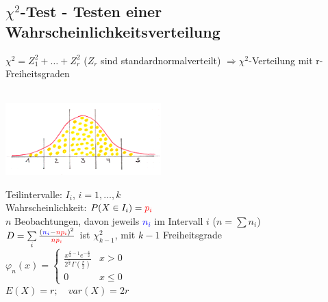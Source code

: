 	\subsection{$\chi^2$-Test - Testen einer Wahrscheinlichkeitsverteilung
	}
		$\chi ^2 = Z_1^2+\ldots+Z_r^2$ ($Z_r$ sind standardnormalverteilt) $\Longrightarrow
		\chi^2$-Verteilung mit r-Freiheitsgraden\\ \\
		\begin{minipage}{6.5cm}
        \includegraphics[width=6cm]{./bilder/chi_quadrat.png}\\
        \end{minipage}
		\begin{minipage}{12cm}
        Teilintervalle: $I_i$, $i=1,\ldots,k$\\
        Wahrscheinlichkeit: $P(X\in I_i)=\textcolor{red}{p_i}$\\
        $n$ Beobachtungen, davon jeweils \textcolor{blue}{$n_i$} im Intervall
        $i$ ($n=\sum n_i$)\\
        $D=\sum\limits_i\frac{(\textcolor{blue}{n_i}-\textcolor{red}{np_i})^2}{\textcolor{red}{np_i}}$
        \hspace{8mm} ist $\chi^2_{k-1}$, mit $k-1$ Freiheitsgrade\\
        $\varphi_n(x)=  \begin{cases}\displaystyle \frac{x^{\frac{r}{2}-1}e^{
        -\frac{x}{2}}}{2^{\frac{r}{2}}\Gamma\left(\frac{r}{2}\right)} & x>0 \\
        0 & x\leq 0 \end{cases} $\\  
		$E(X)=r; \quad var(X)=2r$
        \end{minipage}
		
